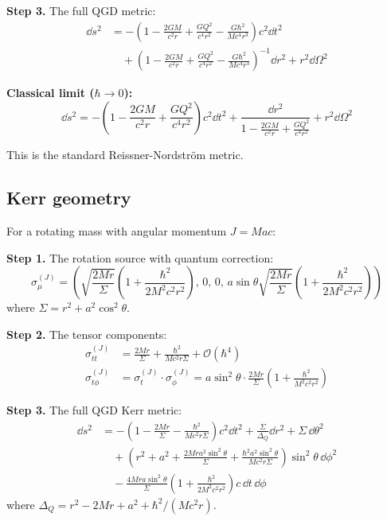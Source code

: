 \documentclass[11pt,a4paper]{article}
\theoremstyle{definition}
\theoremstyle{remark}
\begin{document}
	\textbf{Step 3.} The full QGD metric:
	\begin{equation}
		\boxed{\begin{aligned}
				\dd s^2 &= -\left(1 - \frac{2GM}{c^2 r} + \frac{GQ^2}{c^4 r^2} - \frac{G\hbar^2}{Mc^4 r^3}\right)c^2 \dd t^2 \\[4pt]
				&\quad + \left(1 - \frac{2GM}{c^2 r} + \frac{GQ^2}{c^4 r^2} - \frac{G\hbar^2}{Mc^4 r^3}\right)^{-1}\dd r^2 + r^2 \dd\Omega^2
		\end{aligned}}
		\label{eq:rn_qgd}
	\end{equation}
	
	\textbf{Classical limit ($\hbar \to 0$):}
	\begin{equation}
		\dd s^2 = -\left(1 - \frac{2GM}{c^2 r} + \frac{GQ^2}{c^4 r^2}\right)c^2 \dd t^2 + \frac{\dd r^2}{1 - \frac{2GM}{c^2 r} + \frac{GQ^2}{c^4 r^2}} + r^2 \dd\Omega^2
		\label{eq:rn_classical}
	\end{equation}
	
	This is the standard Reissner-Nordström metric.
	
	\subsection{Kerr geometry}
	
	For a rotating mass with angular momentum $J = Mac$:
	
	\textbf{Step 1.} The rotation source with quantum correction:
	\begin{equation}
		\sigma^{(J)}_\mu = \left(\sqrt{\frac{2Mr}{\Sigma}}\left(1 + \frac{\hbar^2}{2M^2 c^2 r^2}\right), \, 0, \, 0, \, a\sin\theta\sqrt{\frac{2Mr}{\Sigma}}\left(1 + \frac{\hbar^2}{2M^2 c^2 r^2}\right)\right)
		\label{eq:sigma_kerr}
	\end{equation}
	where $\Sigma = r^2 + a^2\cos^2\theta$.
	
	\textbf{Step 2.} The tensor components:
	\begin{align}
		\sigma^{(J)}_{tt} &= \frac{2Mr}{\Sigma} + \frac{\hbar^2}{M c^2 r \Sigma} + \mathcal{O}(\hbar^4) \label{eq:sigma_tt_kerr} \\
		\sigma^{(J)}_{t\phi} &= \sigma^{(J)}_t \cdot \sigma^{(J)}_\phi = a\sin^2\theta \cdot \frac{2Mr}{\Sigma}\left(1 + \frac{\hbar^2}{M^2 c^2 r^2}\right) \label{eq:sigma_tphi_kerr}
	\end{align}
	
	\textbf{Step 3.} The full QGD Kerr metric:
	\begin{equation}
		\boxed{\begin{aligned}
				\dd s^2 &= -\left(1-\frac{2Mr}{\Sigma} - \frac{\hbar^2}{Mc^2 r \Sigma}\right)c^2 \dd t^2 + \frac{\Sigma}{\Delta_Q}\dd r^2 + \Sigma \, \dd\theta^2 \\[4pt]
				&\quad + \left(r^2+a^2+\frac{2Mra^2\sin^2\theta}{\Sigma} + \frac{\hbar^2 a^2 \sin^2\theta}{Mc^2 r \Sigma}\right)\sin^2\theta \, \dd\phi^2 \\[4pt]
				&\quad - \frac{4Mra\sin^2\theta}{\Sigma}\left(1 + \frac{\hbar^2}{2M^2 c^2 r^2}\right) c\,\dd t\,\dd\phi
		\end{aligned}}
		\label{eq:kerr_qgd}
	\end{equation}
	where $\Delta_Q = r^2 - 2Mr + a^2 + \hbar^2/(Mc^2 r)$.
	
\end{document}

